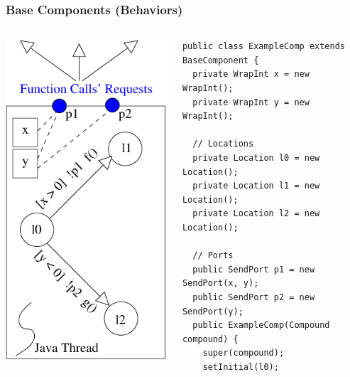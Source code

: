 \documentclass[compress,xcolor=dvipsnames,10pt]{beamer}
\begin{document}
\graphicspath{{figs/}}




\begin{frame}[fragile]
\frametitle{Base Components (Behaviors)}
\begin{columns}
 \begin{column}{0.4\linewidth}
 \begin{center}
 \includegraphics[scale=0.5]{figs/basecomponent.pdf}
\end{center}
  \end{column}
   \begin{column}{0.55\linewidth}
   \begin{lstlisting}[style=customjava, basicstyle=\ttfamily\tiny]
public class ExampleComp extends BaseComponent {
  private WrapInt x = new WrapInt();
  private WrapInt y = new WrapInt();
  
  // Locations
  private Location l0 = new Location();
  private Location l1 = new Location();
  private Location l2 = new Location();
   
  // Ports
  public SendPort p1 = new SendPort(x, y);
  public SendPort p2 = new SendPort(y);
  public ExampleComp(Compound compound) {
    super(compound);
    setInitial(l0);
    

\end{lstlisting}
\end{column}
\end{columns}
\end{frame}
\end{document}

